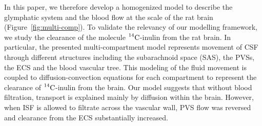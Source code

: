 \documentclass[10pt]{article}
\newcommand{\ie}{\emph{i.e.}\;}
\newcommand{\1}{^{(1)}}
\newcommand{\2}{^{(2)}}
\newcommand{\Cinulin}{$\prescript{14}{}{\text{C}}$-inulin }
\begin{document}
In this paper, we therefore develop a homogenized model to describe the glymphatic system and the blood flow at the scale of the rat brain (Figure~\ref{fig:multi-comp}). To validate the relevancy of our modelling framework, we study the clearance of the molecule \Cinulin from the rat brain. In particular, the presented multi-compartment model represents movement of CSF through different structures including the subarachnoid space (SAS), the PVSs, the ECS and the blood vascular tree. This modeling of the fluid movement is coupled to diffusion-convection equations for each compartment to represent the clearance of \Cinulin from the brain. Our model suggests that without blood filtration, transport is explained mainly by diffusion within the brain. However, when ISF is allowed to filtrate across the vascular wall, PVS flow was reversed and clearance from the ECS substantially increased. 
\end{document}
